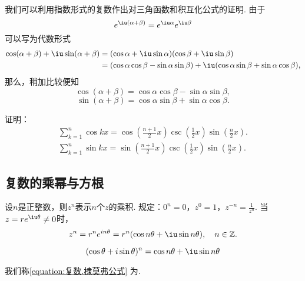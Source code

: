 我们可以利用指数形式的复数作出对三角函数和积互化公式的证明.
由于\begin{equation*}
e^{\iu(\alpha+\beta)}
= e^{\iu \alpha} e^{\iu \beta}
\end{equation*}
可以写为代数形式
\begin{equation*}\begin{aligned}
\cos(\alpha+\beta)+ \iu \sin(\alpha+\beta)
&= (\cos\alpha+ \iu \sin\alpha)(\cos\beta+ \iu \sin\beta) \\
&= (\cos\alpha \cos\beta - \sin\alpha \sin\beta)
    + \iu(\cos\alpha \sin\beta + \sin\alpha \cos\beta),
\end{aligned}\end{equation*}
那么，稍加比较便知\begin{equation*}
\cos(\alpha+\beta) = \cos\alpha \cos\beta - \sin\alpha \sin\beta,
\end{equation*}\begin{equation*}
\sin(\alpha+\beta) = \cos\alpha \sin\beta + \sin\alpha \cos\beta.
\end{equation*}

\begin{example}
证明：\begin{gather}
\sum_{k=1}^n \cos kx
    = \cos(\frac{n+1}{2}x)
    \csc(\frac{1}{2}x)
    \sin(\frac{n}{2}x). \\
\sum_{k=1}^n \sin kx
    = \sin(\frac{n+1}{2}x)
    \csc(\frac{1}{2}x)
    \sin(\frac{n}{2}x).
\end{gather}
\end{example}

\subsection{复数的乘幂与方根}
\begin{definition}
设\(n\)是正整数，则\(z^n\)表示\(n\)个\(z\)的乘积.
规定：\(0^n=0\)，\(z^0=1\)，\(z^{-n}=\frac{1}{z^n}\).
当\(z=re^{\iu \theta} \neq 0\)时，\begin{equation*}
z^n = r^n e^{in\theta} = r^n(\cos n\theta+ \iu \sin n\theta),
\quad n \in \mathbb{Z}.
\end{equation*}
\end{definition}

\begin{theorem}%
\begin{equation}\label{equation:复数.棣莫弗公式}
	(\cos\theta+i\sin\theta)^n = \cos{n\theta}+ \iu \sin{n\theta}
\end{equation}
\end{theorem}
我们称\cref{equation:复数.棣莫弗公式} 为.


